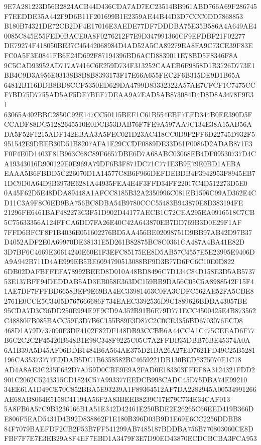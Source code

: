 \documentclass[UTF8,fontset=fandol,zihao=-4,a4paper]{ctexart}
\begin{document}
{{9E7A281223D56B2824ACB44D436CDA7AD7EC23514BB961ABD766A69F286745F7EEDDE35A442F9D6B11F201699B1E2359AE44B44D3D7CCC0DD7868853
B180B74321DE72CB2DF4E17016E3AEDE77DF7DDDBA75E35B586A4A649AE40085C845E55FED0BACE0A8F0276212F7E9D347991366CF9EFDBF21F02277
DE79274F418050BE37C45442068984D4AD52A5CA89279EA8FA9C73CE39F83EFC0A5F3E0841FB6E24D692F87194396BD6ACD8839011E78BD5F8346F8A
9C5CAD93952AD717A7416C6E259D734F313252CAAEB6F9858D1B3726D773E1BB4C9D3A956E03138B8B8B8393173F17E66A655FEC2F6B315DE9D1B65A
64812B116DDB8BD8CCF5350ED629DA4799D83332322A57AE7CFCF1C7475CCF7BD75D7755AD5AF5DE7BEF7DEAA9A7EAD5AB873084D4D8D8A3478F9E31
63065A402BBC2850C92E147CC50115BEF1C61B554EBF7EFD344B0EE390D5FCCADF88DC51282645510E0DCB53DAB76F7FE9A597AA9C134E38A15AB56A
DA5F52F1215ADF142EBAA3A5FEC021D23AC418CC0D9F2FF6D22745D932F5951542E9DBEB30D51B8207AFA1E29CCDF0889DE33D61F0086D2ADAB871E3
F0F4E0D1403F81B963C68C89F6657DBE6D7A68ABC03068EB4DF09530737D4CA19343016D900129E0E969A79DF6B3F871DC71C771E3B9E79E0BD1AEBA
EAAA5B6FBDD5C226070D1A14577C8B6F966DEFDEBDB4F3942953F8945EB71DC9D0A64D9B3973E6281A44935FEA4E4F3FFD34FF22017C4D512273D5E0
0A45F62D5E48DDA89448A1AFCC8185B32A2350996C081EB1596C99AD362E4CD11C3A9F8C6ED9BA756BC8DBA54B9780CCC55483B943870E8D383194FE
21296FE6461BAF482273C3F51D902D44177AECB1C72CEA295EA0916518C7CB5C75633356A124FFCA6DD7FA26E40C42A643870EB7DD769B3D0E29F1AF
7FFD6BFCF8F1B4036E051602276BD5AA456BE02098751D9BB97AB42D97B37D4052ADF2E0A69970DE38131E5D261B82875BC8C0361CA487A4BA41E82D
3D7BF6C4669E30614240E60E1F3EFC85175EE8D5AB57C4557E5E23995E9406DA9A942B711D4AE999EB5BE6094790513088BF9D3B77D6FC6C10E0D822
6DB02DAFBFFEFA78992BEED8D010A48BD8496C7D134C84D158E3D5AB573753E137BFF94DEDDAB5AD3EB058E363DC159BB9DA56C05C5A8988542F15F4
1AE7DF7FFFBD6658BEF9E69BA4EC33981463C0FA3CDFC562AE52FA5CBE82761E0CCE5C3405D767666686F734EAEC3392536D9C1889626BDBA43057BE
95CDA7D3C96DD250E994E9F9CD9A352B91B6E79D771ECC4500425E4B873562C48880FB085BACC59E3D7B6C155B89E3D87C2C0CE3356BD6703076ECD8
468D1A79D737090F3DF4102F82DF148DB93CCBB6A44CCA1C475CEEAD6F77B6C2C2C2F45420B648B1E98C348F9225C05C7A2FFDB35DBB76BE45374A0A
6A1B39A5D45AF06DDB1484B6A564AE375D21BA26A27ED7621FD49C25B5281196CA35373777EDDAB5DC1B6358582BC4659221DB130BED5325070E1C18
AD4A8AE3C235F632D7A759D0CBE9E9A2FAD0E183303FFEF8A3124321FDD2901C2062C5243315CD1824C57A993377EEDCB998CADC45D75DBA74E99210
34EE61A1D49CE70C852BBA5E93239A1F89364512AF7DA2282945A00534991266AE68AB8064E5158C41194A56F2A83BEEB8239C17E79C734E34CAF013
5A8FB6A57C9B3236166B1A51E342D42461E250BDE2E26265C66EED419B366DE806F5EAD5431D4B92D838862F1E180B396D03B9D1E69E6CC2256DDBB8
84F7079BAEFDF2CB2F53B7FF541299AB7485187BDDBA756B770803060CE8DFBF7F7E7E3EB29A8F4EF7EBD1A3479F3E7D90ED43870ECDCBCBA3FCA953
}}
\end{document}
